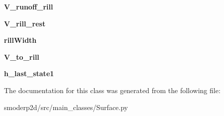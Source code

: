 \begin{DoxyCompactItemize}
\item 
\hypertarget{classsmoderp2d_1_1src_1_1main__classes_1_1Surface_1_1SurArrs_a4694f9abfba295f68a313407b61894dc}{{\bfseries V\-\_\-runoff\-\_\-rill}}\label{classsmoderp2d_1_1src_1_1main__classes_1_1Surface_1_1SurArrs_a4694f9abfba295f68a313407b61894dc}

\item 
\hypertarget{classsmoderp2d_1_1src_1_1main__classes_1_1Surface_1_1SurArrs_a4fd51b130216b239e3b56afe85d984e7}{{\bfseries V\-\_\-rill\-\_\-rest}}\label{classsmoderp2d_1_1src_1_1main__classes_1_1Surface_1_1SurArrs_a4fd51b130216b239e3b56afe85d984e7}

\item 
\hypertarget{classsmoderp2d_1_1src_1_1main__classes_1_1Surface_1_1SurArrs_aa26b1528adae60c9964db0b02ed5ebd2}{{\bfseries rill\-Width}}\label{classsmoderp2d_1_1src_1_1main__classes_1_1Surface_1_1SurArrs_aa26b1528adae60c9964db0b02ed5ebd2}

\item 
\hypertarget{classsmoderp2d_1_1src_1_1main__classes_1_1Surface_1_1SurArrs_a8e9091c6dba8d972439069d549db61ff}{{\bfseries V\-\_\-to\-\_\-rill}}\label{classsmoderp2d_1_1src_1_1main__classes_1_1Surface_1_1SurArrs_a8e9091c6dba8d972439069d549db61ff}

\item 
\hypertarget{classsmoderp2d_1_1src_1_1main__classes_1_1Surface_1_1SurArrs_a80b8f31208066d10c7a605af36def0e8}{{\bfseries h\-\_\-last\-\_\-state1}}\label{classsmoderp2d_1_1src_1_1main__classes_1_1Surface_1_1SurArrs_a80b8f31208066d10c7a605af36def0e8}

\end{DoxyCompactItemize}


The documentation for this class was generated from the following file\-:\begin{DoxyCompactItemize}
\item 
smoderp2d/src/main\-\_\-classes/Surface.\-py\end{DoxyCompactItemize}
